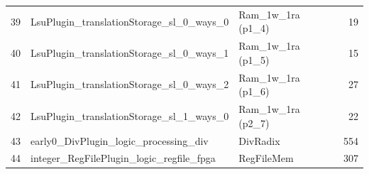\begin{table}[!htbp]
\begin{tabular}{rllr}
39 & \quad\quad\quad LsuPlugin\_translationStorage\_sl\_0\_ways\_0       & Ram\_1w\_1ra (p1\_4)                             &     19 \\
40 & \quad\quad\quad LsuPlugin\_translationStorage\_sl\_0\_ways\_1       & Ram\_1w\_1ra (p1\_5)                             &     15 \\
41 & \quad\quad\quad LsuPlugin\_translationStorage\_sl\_0\_ways\_2       & Ram\_1w\_1ra (p1\_6)                             &     27 \\
42 & \quad\quad\quad LsuPlugin\_translationStorage\_sl\_1\_ways\_0       & Ram\_1w\_1ra (p2\_7)                             &     22 \\
43 & \quad\quad\quad early0\_DivPlugin\_logic\_processing\_div           & DivRadix                                         &    554 \\
44 & \quad\quad\quad integer\_RegFilePlugin\_logic\_regfile\_fpga        & RegFileMem                                       &    307 \\
\bottomrule
\end{tabular}
\end{table}


